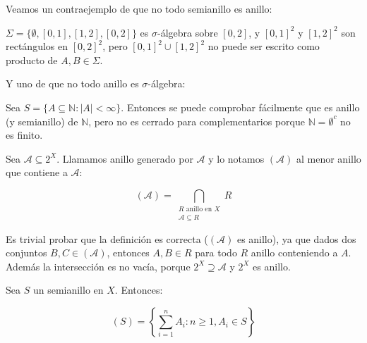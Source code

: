 \begin{counterex}
 Veamos un contraejemplo de que no todo semianillo es anillo:
 
 $\Sigma = \{\emptyset, [0,1], [1,2], [0,2]\}$ es $\sigma$-álgebra sobre $[0,2]$, y $[0,1]^2$ y $[1,2]^2$ son rectángulos
 en $[0,2]^2$, pero $[0,1]^2 \cup [1,2]^2$ no puede ser escrito como producto de $A,B \in \Sigma$.
 
 Y uno de que no todo anillo es $\sigma$-álgebra:
 
 Sea $S = \{A\subseteq \mathbb{N}: |A| < \infty\}$. Entonces se puede comprobar fácilmente que es anillo (y semianillo)
 de $\mathbb{N}$, pero no es cerrado para complementarios porque $\mathbb{N} = \emptyset^c$ no es finito.
\end{counterex}


\begin{definition}
 Sea $\mathcal{A} \subseteq 2^X$. Llamamos anillo generado por $\mathcal{A}$ y lo notamos $(\mathcal{A})$ al
 menor anillo que contiene a $\mathcal{A}$:
 
 \[(\mathcal{A}) = \bigcap_{\begin{array}{c}R \textrm{ anillo en } X\\ \mathcal{A}\subseteq R \end{array}} R\]
\end{definition}

Es trivial probar que la definición es correcta ($(\mathcal{A})$ es anillo), ya que dados dos 
conjuntos $B,C \in (\mathcal{A})$, entonces $A, B \in R$ para todo $R$ anillo conteniendo a $A$. Además la
intersección es no vacía, porque $2^X \supseteq \mathcal{A}$ y $2^X$ es anillo.

\begin{fact}
 Sea $S$ un semianillo en $X$. Entonces:
 
 \[(S) = \left\{\sum_{i=1}^n A_i:  n\ge 1, A_i \in S\right\}\]
 
 \label{claim:semiring}
\end{fact}

